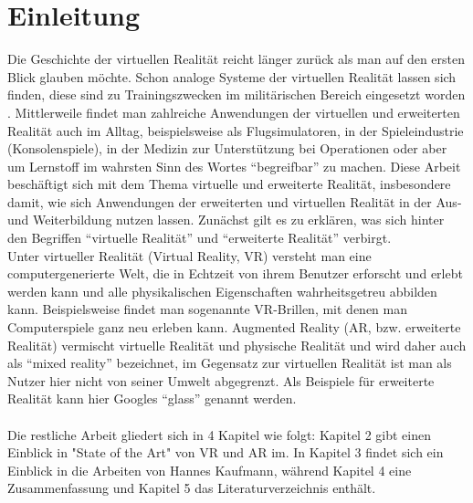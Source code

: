 \documentclass[deutsch]{llncs}
\begin{document}
\tableofcontents
\newpage


\section{Einleitung}
\label{sec:intro}
Die Geschichte der virtuellen Realität reicht länger zurück als man auf den ersten Blick glauben möchte. Schon analoge Systeme der virtuellen Realität lassen sich finden, diese sind zu Trainingszwecken im militärischen Bereich eingesetzt worden \cite{1}. 
Mittlerweile findet man zahlreiche Anwendungen der virtuellen und erweiterten Realität auch im Alltag, beispielsweise als Flugsimulatoren, in der Spieleindustrie (Konsolenspiele), in der Medizin zur Unterstützung bei Operationen oder aber um Lernstoff im wahrsten Sinn des Wortes ``begreifbar'' zu machen. 
Diese Arbeit beschäftigt sich mit dem Thema virtuelle und erweiterte Realität, insbesondere damit, wie sich Anwendungen der erweiterten und virtuellen Realität in der Aus- und Weiterbildung nutzen lassen. 
Zunächst gilt es zu erklären, was sich hinter den Begriffen ``virtuelle Realität'' und ``erweiterte Realität'' verbirgt. 
\noindent \\
Unter virtueller Realität (Virtual Reality, VR) versteht man eine computergenerierte Welt, die in Echtzeit von ihrem Benutzer erforscht und erlebt werden kann und alle physikalischen Eigenschaften wahrheitsgetreu abbilden kann. 
Beispielsweise findet man sogenannte VR-Brillen, mit denen man Computerspiele ganz neu erleben kann.
Augmented Reality (AR, bzw. erweiterte Realität) vermischt virtuelle Realität und physische Realität und wird daher auch als ``mixed reality'' bezeichnet, im Gegensatz zur virtuellen Realität ist man als Nutzer hier nicht von seiner Umwelt abgegrenzt.
Als Beispiele für erweiterte Realität kann hier Googles ``glass'' genannt werden. \\
\noindent \\
Die restliche Arbeit gliedert sich in 4 Kapitel wie folgt: 
Kapitel 2 gibt einen Einblick in "State of the Art" von VR und AR im. In Kapitel 3 findet sich ein Einblick in die Arbeiten von Hannes Kaufmann, während Kapitel 4 eine Zusammenfassung und Kapitel 5 das Literaturverzeichnis enthält.
\end{document}
